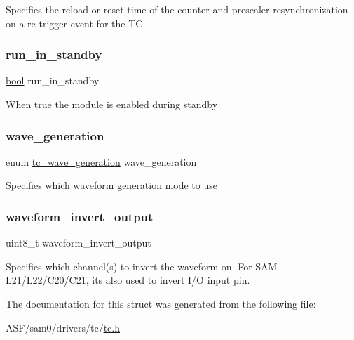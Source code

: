 Specifies the reload or reset time of the counter and prescaler resynchronization on a re-\/trigger event for the TC \mbox{\label{structtc__config_a514964d5c2a8da4dd96bac82a53477f2}} 
\subsubsection{\texorpdfstring{run\_in\_standby}{run\_in\_standby}}
{\footnotesize\ttfamily \mbox{\hyperlink{group__group__sam0__utils_ga97a80ca1602ebf2303258971a2c938e2}{bool}} run\+\_\+in\+\_\+standby}

When {\ttfamily true} the module is enabled during standby \mbox{\label{structtc__config_a5432728b0097b7ac87b9b44b63c62419}} 
\subsubsection{\texorpdfstring{wave\_generation}{wave\_generation}}
{\footnotesize\ttfamily enum \mbox{\hyperlink{group__asfdoc__sam0__tc__group_gae7f1302b7e3d675e471a554668b49d64}{tc\+\_\+wave\+\_\+generation}} wave\+\_\+generation}

Specifies which waveform generation mode to use \mbox{\label{structtc__config_ac9b73d7649d962c76954cc26aebe6f66}} 
\subsubsection{\texorpdfstring{waveform\_invert\_output}{waveform\_invert\_output}}
{\footnotesize\ttfamily uint8\+\_\+t waveform\+\_\+invert\+\_\+output}

Specifies which channel(s) to invert the waveform on. For S\+AM L21/\+L22/\+C20/\+C21, it\textquotesingle{}s also used to invert I/O input pin. 

The documentation for this struct was generated from the following file\+:\begin{DoxyCompactItemize}
\item 
A\+S\+F/sam0/drivers/tc/\mbox{\hyperlink{drivers_2tc_2tc_8h}{tc.\+h}}\end{DoxyCompactItemize}
